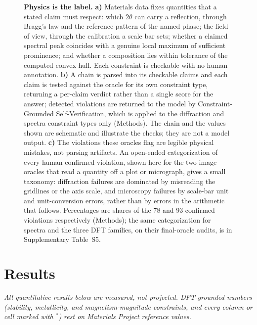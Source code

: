 \documentclass[pdflatex,sn-nature]{sn-jnl}
\newcommand{\rev}[1]{#1}
\newcommand{\rev}[1]{{\color{blue}#1}}
\begin{document}
\begin{figure}[t]
{}
\caption{\justifying\textbf{Physics is the label.} \textbf{a)} Materials data fixes quantities that a stated claim must respect: which $2\theta$ can carry a reflection, through Bragg's law and the reference pattern of the named phase; the field of view, through the calibration a scale bar sets; whether a claimed spectral peak coincides with a genuine local maximum of sufficient prominence; and whether a composition lies within tolerance of the computed convex hull. Each constraint is checkable with no human annotation. \textbf{b)} A chain is parsed into its checkable claims and each claim is tested against the oracle for its own constraint type, returning a per-claim verdict rather than a single score for the answer; detected violations are returned to the model by Constraint-Grounded Self-Verification, which is applied to the diffraction and spectra constraint types only (Methods). The chain and the values shown are schematic and illustrate the checks; they are not a model output. \textbf{c)} The violations these oracles flag are legible physical mistakes, not parsing artifacts. \rev{An open-ended categorization of every human-confirmed violation, shown here for the two image oracles that read a quantity off a plot or micrograph,} gives a small taxonomy: diffraction failures are dominated by misreading the gridlines or the axis scale, and microscopy failures by scale-bar unit and unit-conversion errors, rather than by errors in the arithmetic that follows. Percentages are shares of the 78 and 93 confirmed violations respectively \rev{(Methods); the same categorization for spectra and the three DFT families, on their final-oracle audits, is in Supplementary Table~S5}.}
\label{fig:teaser}
\end{figure}

\section*{Results}
\emph{All quantitative results below are measured, not projected. DFT-grounded
numbers (stability, metallicity, and magnetism-magnitude constraints, and every column or
cell marked with $^{*}$) rest on Materials Project reference values.}
\end{document}
